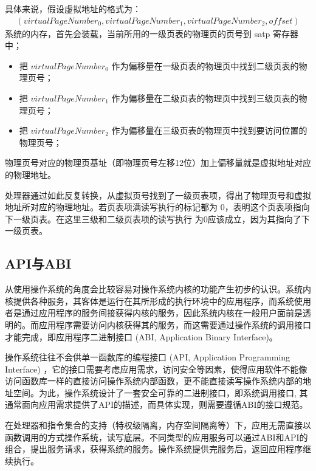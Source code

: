 具体来说，假设虚拟地址的格式为：
\begin{equation}
    \label{equation:c2vpn}
    \begin{aligned}
        (virtualPageNumber_{0} ,virtualPageNumber_{1},virtualPageNumber_{2},offset)
    \end{aligned}
\end{equation}
	系统的内存，首先会装载，当前所用的一级页表的物理页的页号到 satp 寄存器中；
    \begin{itemize}
	\item 把 $virtualPageNumber_{0}$ 作为偏移量在一级页表的物理页中找到二级页表的物理页号；
	\item 把 $virtualPageNumber_{1}$ 作为偏移量在二级页表的物理页中找到三级页表的物理页号；
	\item 把 $virtualPageNumber_{2}$ 作为偏移量在三级页表的物理页中找到要访问位置的物理页号；
    \end{itemize}

物理页号对应的物理页基址（即物理页号左移12位）加上偏移量就是虚拟地址对应的物理地址。

处理器通过如此反复转换，从虚拟页号找到了一级页表项，得出了物理页号和虚拟地址所对应的物理地址。若页表项满读写执行的标记都为 0，表明这个页表项指向下一级页表。在这里三级和二级页表项的读写执行 为0应该成立，因为其指向了下一级页表。


\subsection{API与ABI}

从使用操作系统的角度会比较容易对操作系统内核的功能产生初步的认识。系统内核提供各种服务，其客体是运行在其所形成的执行环境中的应用程序，而系统使用者是通过应用程序的服务间接获得内核的服务，因此系统内核在一般用户面前是透明的。而应用程序需要访问内核获得其的服务，而这需要通过操作系统的调用接口才能完成，即应用程序二进制接口 (ABI, Application Binary Interface)。

操作系统往往不会供单一函数库的编程接口 (API, Application Programming Interface) ，它的接口需要考虑应用需求，访问安全等因素，使得应用软件不能像访问函数库一样的直接访问操作系统内部函数，更不能直接读写操作系统内部的地址空间。为此，操作系统设计了一套安全可靠的二进制接口，即系统调用接口, 其通常面向应用需求提供了API的描述，而具体实现，则需要遵循ABI的接口规范。

在处理器和指令集合的支持（特权级隔离，内存空间隔离等）下，应用无需直接以函数调用的方式操作系统，读写底层。不同类型的应用服务可以通过ABI和API的组合，提出服务请求，获得系统的服务。操作系统提供完服务后，返回应用程序继续执行。

